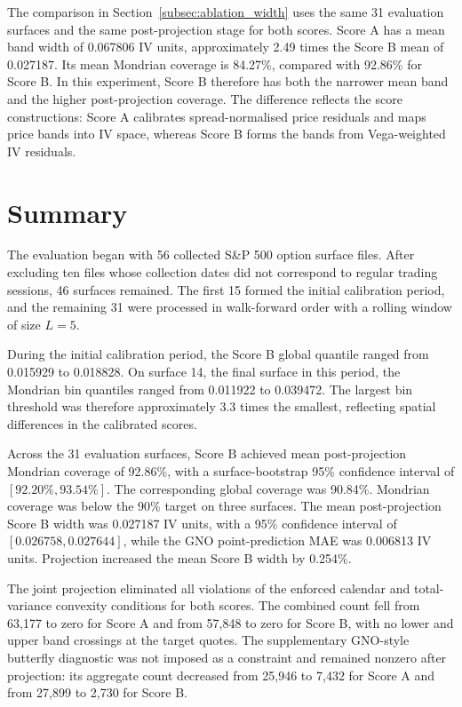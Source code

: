 The comparison in Section~\ref{subsec:ablation_width} uses the same 31 evaluation surfaces and the same post-projection stage for both scores. Score A has a mean band width of 0.067806 IV units, approximately 2.49 times the Score B mean of 0.027187. Its mean Mondrian coverage is 84.27\%, compared with 92.86\% for Score B. In this experiment, Score B therefore has both the narrower mean band and the higher post-projection coverage. The difference reflects the score constructions: Score A calibrates spread-normalised price residuals and maps price bands into IV space, whereas Score B forms the bands from Vega-weighted IV residuals.

\clearpage
\section{Summary}
\label{sec:exp_summary}

The evaluation began with 56 collected S\&P 500 option surface files. After excluding ten files whose collection dates did not correspond to regular trading sessions, 46 surfaces remained. The first 15 formed the initial calibration period, and the remaining 31 were processed in walk-forward order with a rolling window of size $L=5$.

During the initial calibration period, the Score B global quantile ranged from 0.015929 to 0.018828. On surface 14, the final surface in this period, the Mondrian bin quantiles ranged from 0.011922 to 0.039472. The largest bin threshold was therefore approximately 3.3 times the smallest, reflecting spatial differences in the calibrated scores.

Across the 31 evaluation surfaces, Score B achieved mean post-projection Mondrian coverage of 92.86\%, with a surface-bootstrap 95\% confidence interval of $[92.20\%,93.54\%]$. The corresponding global coverage was 90.84\%. Mondrian coverage was below the 90\% target on three surfaces. The mean post-projection Score B width was 0.027187 IV units, with a 95\% confidence interval of $[0.026758,0.027644]$, while the GNO point-prediction MAE was 0.006813 IV units. Projection increased the mean Score B width by 0.254\%.

The joint projection eliminated all violations of the enforced calendar and total-variance convexity conditions for both scores. The combined count fell from 63{,}177 to zero for Score A and from 57{,}848 to zero for Score B, with no lower and upper band crossings at the target quotes. The supplementary GNO-style butterfly diagnostic was not imposed as a constraint and remained nonzero after projection: its aggregate count decreased from 25{,}946 to 7{,}432 for Score A and from 27{,}899 to 2{,}730 for Score B.

